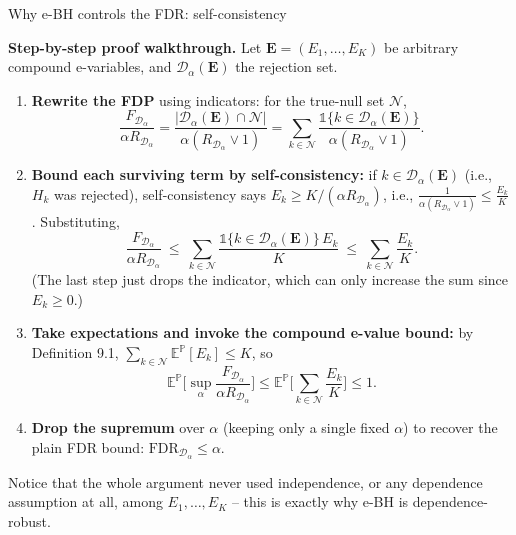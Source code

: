\documentclass[aspectratio=169,10pt]{beamer}
\newcommand{\Nc}{\mathcal{N}}
\begin{document}
\begin{frame}[allowframebreaks]{Why e-BH controls the FDR: self-consistency}
\framebreak

\textbf{Step-by-step proof walkthrough.} Let $\mathbf{E}=(E_1,\dots,E_K)$ be arbitrary compound e-variables, and $\mathcal{D}_\alpha(\mathbf{E})$ the rejection set.

\begin{enumerate}
\item \textbf{Rewrite the FDP} using indicators: for the true-null set $\Nc$,
\[
\frac{F_{\mathcal{D}_\alpha}}{\alpha R_{\mathcal{D}_\alpha}} = \frac{|\mathcal{D}_\alpha(\mathbf{E})\cap\Nc|}{\alpha(R_{\mathcal{D}_\alpha}\vee 1)} = \sum_{k\in\Nc} \frac{\mathbb{1}\{k\in\mathcal{D}_\alpha(\mathbf{E})\}}{\alpha(R_{\mathcal{D}_\alpha}\vee 1)}.
\]
\item \textbf{Bound each surviving term by self-consistency:} if $k \in \mathcal{D}_\alpha(\mathbf{E})$ (i.e., $H_k$ was rejected), self-consistency says $E_k \ge K/(\alpha R_{\mathcal{D}_\alpha})$, i.e., $\frac{1}{\alpha (R_{\mathcal{D}_\alpha}\vee 1)} \le \frac{E_k}{K}$. Substituting,
\[
\frac{F_{\mathcal{D}_\alpha}}{\alpha R_{\mathcal{D}_\alpha}} \ \le\ \sum_{k\in\Nc} \frac{\mathbb{1}\{k\in\mathcal{D}_\alpha(\mathbf{E})\}\, E_k}{K} \ \le\ \sum_{k\in\Nc} \frac{E_k}{K}.
\]
(The last step just drops the indicator, which can only increase the sum since $E_k\ge0$.)
\item \textbf{Take expectations and invoke the compound e-value bound:} by Definition 9.1, $\sum_{k\in\Nc}\mathbb{E}^{\mathbb{P}}[E_k] \le K$, so
\[
\mathbb{E}^{\mathbb{P}}\Big[\sup_{\alpha}\frac{F_{\mathcal{D}_\alpha}}{\alpha R_{\mathcal{D}_\alpha}}\Big] \le \mathbb{E}^{\mathbb{P}}\Big[\sum_{k\in\Nc}\frac{E_k}{K}\Big] \le 1.
\]
\item \textbf{Drop the supremum} over $\alpha$ (keeping only a single fixed $\alpha$) to recover the plain FDR bound: $\text{FDR}_{\mathcal{D}_\alpha} \le \alpha$.
\end{enumerate}
Notice that the whole argument never used independence, or any dependence assumption at all, among $E_1,\dots,E_K$ -- this is exactly why e-BH is dependence-robust.

\end{frame}
\end{document}
